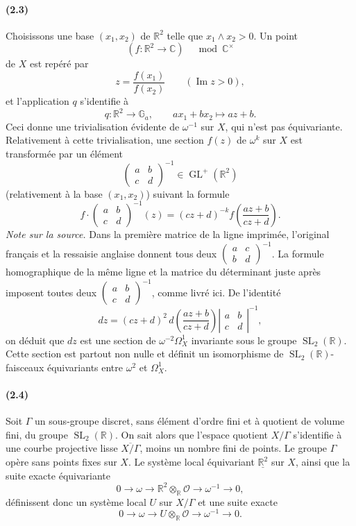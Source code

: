 \documentclass[10pt]{article}
\newcommand{\C}{\mathbb C}
\newcommand{\R}{\mathbb R}
\newcommand{\Ga}{\mathbb G_a}
\newcommand{\GL}{\operatorname{GL}}
\newcommand{\SL}{\operatorname{SL}}
\newcommand{\cO}{\mathcal O}
\begin{document}
\paragraph{(2.3)}
Choisissons une base $(x_1,x_2)$ de $\R^2$ telle que $x_1\wedge x_2>0$. Un point
\[
(f:\R^2\to \C)\quad \bmod \C^\times
\]
de $X$ est repéré par
\[
z=\frac{f(x_1)}{f(x_2)}\qquad (\operatorname{Im}z>0),
\]
et l'application $q$ s'identifie à
\[
q:\R^2\to\Ga,\qquad ax_1+bx_2\longmapsto az+b.
\]
Ceci donne une trivialisation évidente de $\omega^{-1}$ sur $X$, qui n'est pas équivariante.
Relativement à cette trivialisation, une section $f(z)$ de $\omega^k$ sur $X$ est transformée
par un élément
\[
\begin{pmatrix}a&b\\ c&d\end{pmatrix}^{-1}\in \GL^+(\R^2)
\]
(relativement à la base $(x_1,x_2)$) suivant la formule
\[
f\cdot
\begin{pmatrix}a&b\\ c&d\end{pmatrix}^{-1}(z)
=(cz+d)^{-k}f\!\left(\frac{az+b}{cz+d}\right).
\]
\noindent\emph{Note sur la source.} Dans la première matrice de la ligne imprimée,
l'original français et la ressaisie anglaise donnent tous deux
$\left(\begin{smallmatrix}a&c\\ b&d\end{smallmatrix}\right)^{-1}$.
La formule homographique de la même ligne et la matrice du déterminant juste après
imposent toutes deux $\left(\begin{smallmatrix}a&b\\ c&d\end{smallmatrix}\right)^{-1}$,
comme livré ici.
De l'identité
\[
dz=(cz+d)^2\,d\!\left(\frac{az+b}{cz+d}\right)
\left|\begin{matrix}a&b\\ c&d\end{matrix}\right|^{-1},
\]
on déduit que $dz$ est une section de $\omega^{-2}\Omega^1_X$ invariante sous le groupe
$\SL_2(\R)$. Cette section est partout non nulle et définit un isomorphisme de
$\SL_2(\R)$-faisceaux équivariants entre $\omega^2$ et $\Omega^1_X$.

\paragraph{(2.4)}
Soit $\Gamma$ un sous-groupe discret, sans élément d'ordre fini et à quotient de volume
fini, du groupe $\SL_2(\R)$. On sait alors que l'espace quotient $X/\Gamma$ s'identifie à
une courbe projective lisse $\overline{X/\Gamma}$, moins un nombre fini de points. Le groupe
$\Gamma$ opère sans points fixes sur $X$. Le système local équivariant $\underline{\R^2}$
sur $X$, ainsi que la suite exacte équivariante
\[
0\to \omega\to \R^2\otimes_\R\cO\to\omega^{-1}\to 0,
\]
définissent donc un système local $U$ sur $X/\Gamma$ et une suite exacte
\[
0\to \omega\to U\otimes_\R\cO\to\omega^{-1}\to 0.\tag{2.5}
\]
\end{document}

